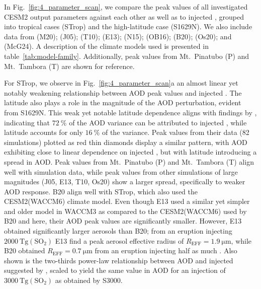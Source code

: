 \documentclass[draft]{agujournal2019}
\begin{document}
  In Fig.~\ref{fig:4_parameter_scan}, we compare the peak values of all investigated
  CESM2 output parameters against each other as well as to injected , grouped
  into tropical cases (STrop) and the high-latitude case (S1629N). We also include data
  from  (M20);  (J05);  (T10);
   (E13);  (N15); 
  (OB16);  (B20);  (Os20); and 
  (McG24). A description of the climate models used is presented in
  table~\ref{tab:model-family}. Additionally, peak values from Mt.\ Pinatubo (P) and
  Mt.\ Tambora (T) are shown for reference.

  For STrop, we observe in Fig.~\ref{fig:4_parameter_scan}a an almost linear yet notably
  weakening relationship between AOD peak values and injected . The latitude
  also plays a role in the magnitude of the AOD perturbation, evident from S1629N. This
  weak yet notable latitude dependence aligns with findings by ,
  indicating that \(\SI{72}{\percent}\) of the AOD variance can be attributed to
  injected , while latitude accounts for only \(\SI{16}{\percent}\) of the
  variance. Peak values from their data (82 simulations) plotted as red thin diamonds
  display a similar pattern, with AOD exhibiting close to linear dependence on injected
  , but with latitude introducing a spread in AOD. Peak values from
  Mt.\ Pinatubo (P) and Mt.\ Tambora (T) align well with simulation data, while peak
  values from other simulations of large  magnitudes (J05, E13, T10, Os20) show
  a larger spread, specifically to weaker AOD response. B20 align well with STrop, which
  also used the CESM2(WACCM6) climate model. Even though E13 used a similar yet simpler
  and older model in WACCM3 as compared to the CESM2(WACCM6) used by B20 and here, their
  AOD peak values are significantly smaller. However, E13 obtained significantly larger
  aerosols than B20; from an eruption injecting
  \(\SI{2000}{\tera\gram(\mathrm{SO_{2}})}\) E13 find a peak aerosol effective radius of
  \(R_{\mathrm{EFF}}=\SI{1.9}{\micro\meter}\), while B20 obtained
  \(R_{\mathrm{EFF}}=\SI{0.7}{\micro\meter}\) from an eruption injecting half as much
  . Also shown is the two-thirds power-law relationship between AOD and injected
   suggested by , scaled to yield the same value in AOD for
  an injection of \(\SI{3000}{\tera\gram(\mathrm{SO_{2}})}\) as obtained by S3000.
\end{document}
